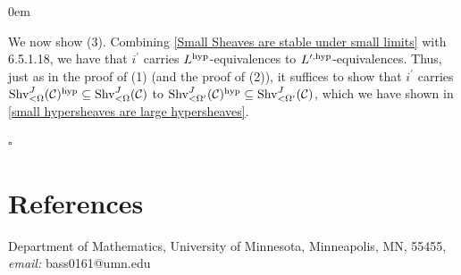 \documentclass[10pt]{article}
\newcommand{\C}{\mathcal C}
\renewcommand{\qed}{\hfill$\square$}
\renewenvironment{proof}{\begin{addmargin}[1em]{0em}\begin{newproof}}{\end{newproof}\end{addmargin}\qed}
\theoremstyle{witharg}
\theoremstyle{witharg}
\theoremstyle{witharg2}
\begin{document}
\begin{proof}
We now show (3). Combining \ref{Small Sheaves are stable under small limits} with  6.5.1.18, we have that $i^\prime$ carries $L^{\textnormal{hyp}}$-equivalences to $L^{\prime,\textnormal{hyp}}$-equivalences. Thus, just as in the proof of (1) (and the proof of (2)), it suffices to show that $i^\prime$ carries $\textnormal{Shv}^J_{<\Omega}(\C)^{\textnormal{hyp}}\subseteq \textnormal{Shv}^J_{<\Omega}(\C)$ to $\textnormal{Shv}^J_{<\Omega^\prime}(\C)^{\textnormal{hyp}}\subseteq \textnormal{Shv}^J_{<\Omega^\prime}(\C)$, which we have shown in \ref{small hypersheaves are large hypersheaves}. 
    
    
\end{proof}


\newpage




\section*{References}
\printbibliography[heading=none]



\vspace{20pt}

\noindent Department of Mathematics, University of Minnesota, Minneapolis, MN, 55455, \emph{email:} bass0161@umn.edu
\end{document}
